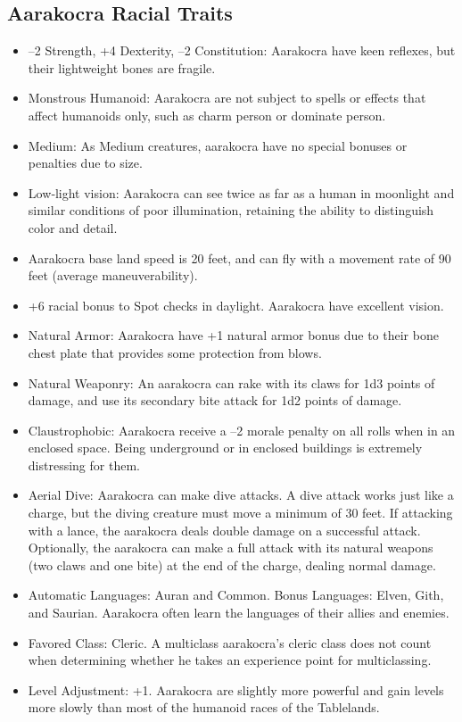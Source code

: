 \documentclass[10pt,a4paper,twocolumn]{d20}
\begin{document}
\subsection{Aarakocra Racial Traits}
\begin{itemize}
    \item –2 Strength, +4 Dexterity, –2 Constitution: Aarakocra have keen reflexes, but their lightweight bones are fragile.
    \item Monstrous Humanoid: Aarakocra are not subject to spells or effects that affect humanoids only, such as charm person or dominate person.
    \item Medium: As Medium creatures, aarakocra have no special bonuses or penalties due to size.
    \item Low‐light vision: Aarakocra can see twice as far as a human in moonlight and similar conditions of poor illumination, retaining the ability to distinguish color and detail.
    \item Aarakocra base land speed is 20 feet, and can fly with a movement rate of 90 feet (average maneuverability).
    \item +6 racial bonus to Spot checks in daylight. Aarakocra have excellent vision.
    \item Natural Armor: Aarakocra have +1 natural armor bonus due to their bone chest plate that provides some protection from blows.
    \item Natural Weaponry: An aarakocra can rake with its claws for 1d3 points of damage, and use its secondary bite attack for 1d2 points of damage.
    \item Claustrophobic: Aarakocra receive a –2 morale penalty on all rolls when in an enclosed space. Being underground or in enclosed buildings is extremely distressing for them.
    \item Aerial Dive: Aarakocra can make dive attacks. A dive attack works just like a charge, but the diving creature must move a minimum of 30 feet. If attacking with a lance, the aarakocra deals double damage on a successful attack. Optionally, the aarakocra can make a full attack with its natural weapons (two claws and one bite) at the end of the charge, dealing normal damage.
    \item Automatic Languages: Auran and Common. Bonus Languages: Elven, Gith, and Saurian. Aarakocra often learn the languages of their allies and enemies.
    \item Favored Class: Cleric. A multiclass aarakocra’s cleric class does not count when determining whether he takes an experience point for multiclassing.
    \item Level Adjustment: +1. Aarakocra are slightly more powerful and gain levels more slowly than most of the humanoid races of the Tablelands.
\end{itemize}
\end{document}
